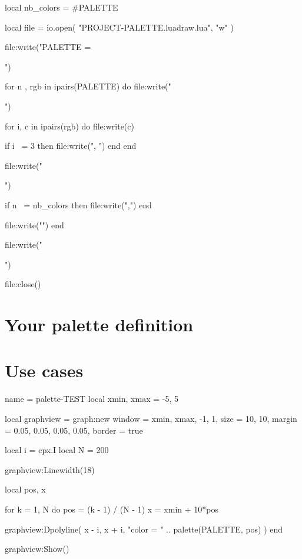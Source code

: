 \begin{luacode*}
local nb_colors = #PALETTE

local file = io.open(
  "PROJECT-PALETTE.luadraw.lua",
  "w"
)

file:write("PALETTE = {\n")

for n , rgb in ipairs(PALETTE) do
  file:write("  {")

  for i, c in ipairs(rgb) do
    file:write(c)

    if i ~= 3 then
      file:write(", ")
    end
  end

  file:write("}")

  if n ~= nb_colors then
    file:write(",")
  end

  file:write("\n")
end

file:write("}\n")

file:close()
\end{luacode*}



\section*{Your palette definition}



\section*{Use cases}

\centering

\begin{luadraw}{name = palette-TEST}
local xmin, xmax = -5, 5

local graphview = graph:new{
  window = {xmin, xmax, -1, 1},
  size   = {10, 10},
  margin = {0.05, 0.05, 0.05, 0.05},
  border = true
}

local i = cpx.I
local N = 200

graphview:Linewidth(18)

local pos, x

for k = 1, N do
  pos = (k - 1) / (N - 1)
  x   = xmin + 10*pos

  graphview:Dpolyline(
    {x - i, x + i},
    "color = " .. palette(PALETTE, pos)
  )
end

graphview:Show()
\end{luadraw}


\bigskip


